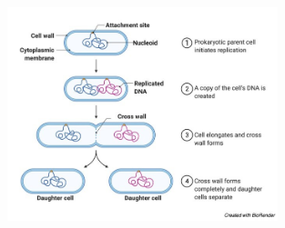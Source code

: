 \documentclass[12pt, a4paper]{article}
\begin{document}
\begin{figure}[H]
    \center
    \includegraphics[width=0.7\textwidth]{Fig1.4.png}
\end{figure}
\end{document}
